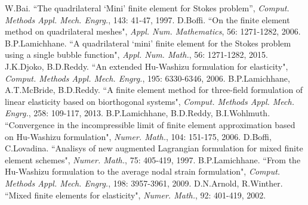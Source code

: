 \documentclass[preprint,12pt,authoryear]{elsarticle}
\begin{document}




\begin{thebibliography}{00}
 W.Bai. 
``The quadrilateral `Mini' finite element for Stokes problem'',
{\it{Comput. Methods Appl. Mech. Engrg.}}, 143: 41-47, 1997.
 D.Boffi. ``On the finite element method on quadrilateral meshes", 
{\it{Appl. Num. Mathematics}}, 56: 1271-1282, 2006.
 B.P.Lamichhane. ``A quadrilateral `mini' finite element for the  Stokes problem using a single bubble function", {\it{Appl. Num. Math.}}, 56: 1271-1282, 2015. 
 J.K.Djoko, B.D.Reddy. ``An extended Hu-Washizu formulation for elasticity", {\it{Comput. Methods Appl. Mech. Engrg.}}, 195: 6330-6346, 2006. 
 B.P.Lamichhane, A.T.McBride, B.D.Reddy. ``A finite element method for three-field formulation of linear elasticity based on biorthogonal systems", 
{\it{Comput. Methods Appl. Mech. Engrg.}}, 258: 109-117, 2013.
 B.P.Lamichhane, B.D.Reddy, B.I.Wohlmuth. ``Convergence in the incompressible limit of finite element approximation based on Hu-Washizu formulation", 
{\it{Numer. Math.}}, 104: 151-175, 2006.
 D.Boffi, C.Lovadina. ``Analisys of new augmented Lagrangian formulation for mixed finite element schemes", 
{\it{Numer. Math.}}, 75: 405-419, 1997.
 B.P.Lamichhane. ``From the Hu-Washizu formulation to the average nodal strain formulation", 
{\it{Comput. Methods Appl. Mech. Engrg.}}, 198: 3957-3961, 2009.
 D.N.Arnold, R.Winther. ``Mixed finite elements for elasticity", 
{\it{Numer. Math.}}, 92: 401-419, 2002.

\end{thebibliography}
\end{document}
